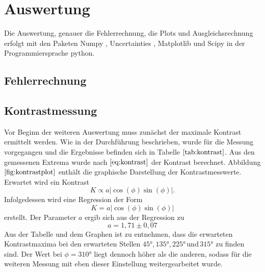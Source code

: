 \section{Auswertung}
Die Auswertung, genauer die Fehlerrechnung, die Plots und Ausgleichsrechnung erfolgt mit den Paketen
Numpy \cite{numpy}, Uncertainties \cite{uncertainties}, Matplotlib \cite{matplotlib} und Scipy \cite{scipy} in der Programmiersprache python.
\subsection{Fehlerrechnung}

\subsection{Kontrastmessung}
Vor Beginn der weiteren Auswertung muss zunächst der maximale Kontrast ermittelt werden.
Wie in der Durchführung beschrieben, wurde für die Messung vorgegangen und die Ergebnisse befinden sich in Tabelle $\ref{tab:kontrast}$.
Aus den gemessenen Extrema wurde nach $\ref{eq:kontrast}$ der Kontrast berechnet.
Abbildung $\ref{fig:kontrastplot}$ enthält die graphische Darstellung der Kontrastmesswerte.
Erwartet wird ein Kontrast
\begin{equation}
  K \propto a|\cos(\phi)\sin(\phi)|.
\end{equation}
Infolgedessen wird eine Regression der Form
\begin{equation}
  K = a|\cos(\phi)\sin(\phi)|
\end{equation}
erstellt. Der Parameter $a$ ergib sich aus der Regression zu
\begin{equation*}
  a = 1,71 \pm 0,07
\end{equation*}
Aus der Tabelle und dem Graphen ist zu entnehmen, dass die erwarteten Kontrastmaxima bei den erwarteten Stellen $45° , 135° , 225° \, \text{und} \, 315°$ zu finden sind.
Der Wert bei $\phi = 310°$ liegt dennoch höher als die anderen, sodass für die weiteren Messung mit eben dieser Einstellung weitergearbeitet wurde.

